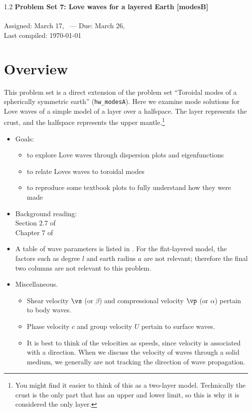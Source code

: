 \documentclass[11pt,titlepage,fleqn]{article}
\begin{document}

\begin{spacing}{1.2}
\centering
{\large \bf Problem Set 7: Love waves for a layered Earth [modesB]} \\
\cltag\ \\
Assigned: March 17, \cyear\ --- Due: March 26, \cyear\ \\
Last compiled: \today
\end{spacing}


\section*{Overview}

This problem set is a direct extension of the problem set ``Toroidal modes of a spherically symmetric earth'' (\verb+hw_modesA+). Here we examine mode solutions for Love waves of a simple model of a layer over a halfspace. The layer represents the crust, and the halfspace represents the upper mantle.\footnote{You might find it easier to think of this as a two-layer model. Technically the crust is the only part that has an upper and lower limit, so this is why it is considered the only layer.}

\begin{itemize}
\item Goals:
%
\begin{itemize}
\item to explore Love waves through dispersion plots and eigenfunctions
\item to relate Loves waves to toroidal modes
\item to reproduce some textbook plots to fully understand how they were made
\end{itemize}

\item Background reading: \\
Section 2.7 of \citet{SteinWysession} \\
Chapter 7 of \citet{AkiRichardsE2}

\item A table of wave parameters is listed in . For the flat-layered model, the factors such as degree $l$ and earth radius $a$ are not relevant; therefore the final two columns are not relevant to this problem.

\item Miscellaneous.
\begin{itemize}
\item Shear velocity $\vs$ (or $\beta$) and compressional velocity $\vp$ (or $\alpha$) pertain to body waves.
\item Phase velocity $c$ and group velocity $U$ pertain to surface waves.
\item It is best to think of the velocities as speeds, since velocity is associated with a direction. When we discuss the velocity of waves through a solid medium, we generally are not tracking the direction of wave propagation.
\end{itemize}

\end{itemize}
\end{document}
